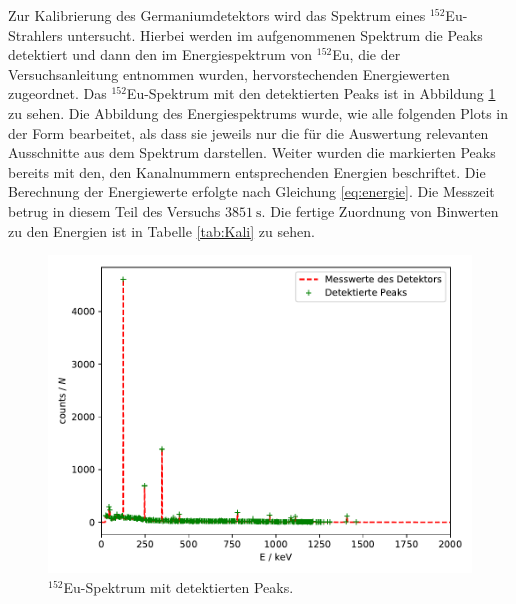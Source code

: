 Zur Kalibrierung des Germaniumdetektors wird das Spektrum eines $^{152}$Eu-Strahlers untersucht. Hierbei
werden im aufgenommenen Spektrum die Peaks detektiert und dann den im Energiespektrum von $^{152}$Eu, die der
Versuchsanleitung \cite{Q1} entnommen wurden, hervorstechenden Energiewerten zugeordnet. Das
$^{152}$Eu-Spektrum mit den detektierten Peaks ist in
Abbildung \ref{abb:Europiumspektrum} zu sehen. Die Abbildung des
Energiespektrums wurde, wie alle folgenden Plots in der Form bearbeitet, als
dass sie jeweils nur die für die Auswertung relevanten Ausschnitte aus dem
Spektrum darstellen. Weiter wurden die markierten Peaks bereits mit den, den
Kanalnummern entsprechenden Energien beschriftet. Die Berechnung der
Energiewerte erfolgte nach Gleichung \ref{eq:energie}. Die Messzeit betrug in diesem Teil des Versuchs $\SI{3851}{\second}$.
Die fertige Zuordnung von Binwerten zu den Energien ist in Tabelle
\ref{tab:Kali} zu sehen.
\FloatBarrier
\begin{figure}
    \centering
    \includegraphics[scale=0.7]{Detektormesswerte.pdf}
    \caption{$^{152}$Eu-Spektrum mit detektierten Peaks.}
    \label{abb:Europiumspektrum}
\end{figure}
\FloatBarrier

